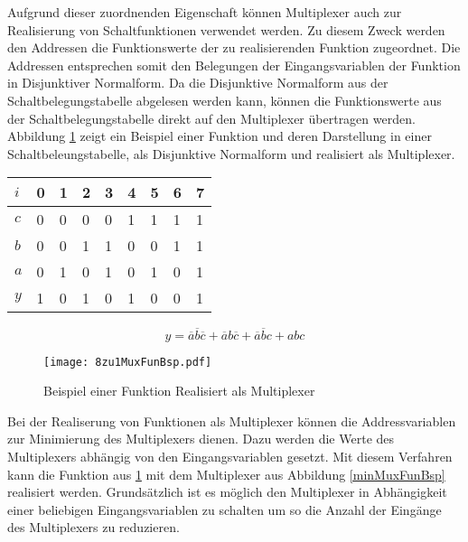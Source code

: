 Aufgrund dieser zuordnenden Eigenschaft können Multiplexer auch zur Realisierung von Schaltfunktionen verwendet werden. Zu diesem Zweck werden den Addressen die Funktionswerte der zu realisierenden Funktion zugeordnet. Die Addressen entsprechen somit den Belegungen der Eingangsvariablen der Funktion in Disjunktiver Normalform. Da die Disjunktive Normalform aus der Schaltbelegungstabelle abgelesen werden kann, können die Funktionswerte aus der Schaltbelegungstabelle direkt auf den Multiplexer übertragen werden. Abbildung \ref{FunMuxBsp} zeigt ein Beispiel einer Funktion und deren Darstellung in einer Schaltbeleungstabelle, als Disjunktive Normalform und realisiert als Multiplexer.
\begin{table}[htp]
	\centering
	\begin{tabular}{*{9}{l}}    
	$i$ & 0 & 1 & 2 & 3 & 4 & 5 & 6 & 7 \\ \hline
	$c$ & 0 & 0 & 0 & 0 & 1 & 1 & 1 & 1 \\
	$b$ & 0 & 0 & 1 & 1 & 0 & 0 & 1 & 1 \\
	$a$ & 0 & 1 & 0 & 1 & 0 & 1 & 0 & 1 \\ \hline
	$y$ & 1 & 0 & 1 & 0 & 1 & 0 & 0 & 1 \\
	\end{tabular}
\end{table}
$$ y = \overline{a}\overline{b}\overline{c} + \overline{a}b\overline{c} + \overline{a}\overline{b}c + abc $$
\begin{figure}[htp]	
	\centering
	\texttt{[image: 8zu1MuxFunBsp.pdf]}
	\caption{Beispiel einer Funktion Realisiert als Multiplexer}
	\label{FunMuxBsp}
\end{figure}

Bei der Realiserung von Funktionen als Multiplexer können die Addressvariablen zur Minimierung des Multiplexers dienen. Dazu werden die Werte des Multiplexers abhängig von den Eingangsvariablen gesetzt. Mit diesem Verfahren kann die Funktion aus \ref{FunMuxBsp} mit dem Multiplexer aus Abbildung \ref{minMuxFunBsp} realisiert werden. Grundsätzlich ist es möglich den Multiplexer in Abhängigkeit einer beliebigen Eingangsvariablen zu schalten um so die Anzahl der Eingänge des Multiplexers zu reduzieren. 

